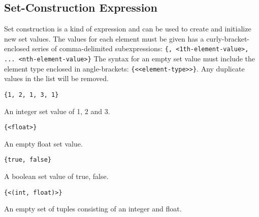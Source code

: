 
\subsection{Set-Construction Expression}
{
	Set construction is a kind of expression and can be
	used to create and initialize new set values.
	The values for each element must be given has a curly-bracket-enclosed
	series of comma-delimited
	subexpressions: \texttt{\{<0th-element-value>, <1th-element-value>, ... <nth-element-value>\}}
	The syntax for an empty set value must include the element type enclosed
	in angle-brackets: \texttt{\{<<element-type>>\}}.
	Any duplicate values in the list will be removed.
	
	\begin{itemize}
	{
		\item[] \texttt{\{1, 2, 1, 3, 1\}}
		
			An integer set value of 1, 2 and 3.
		
		\item[] \texttt{\{<float>\}}
		
			An empty float set value.
		
		\item[] \texttt{\{true, false\}}
		
			A boolean set value of true, false.
		
		\item[] \texttt{\{<(int, float)>\}}
		
			An empty set of tuples consisting
				of an integer and float.
	}
	\end{itemize}
}
